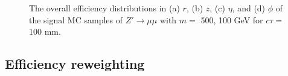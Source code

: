 \begin{figure}[!htb]
    \caption{The overall efficiency distributions in (a) $r$, (b) $z$, (c) $\eta$, and (d) $\phi$ of the signal MC samples of $Z'\rightarrow \mu\mu$ with $m=$ 500, 100 GeV for $c\tau=$ 100 mm.}
    \label{fig:signal_vertex_dist}
\end{figure}

\subsection{Efficiency reweighting}
\label{sec:efficiency_reweighting}









